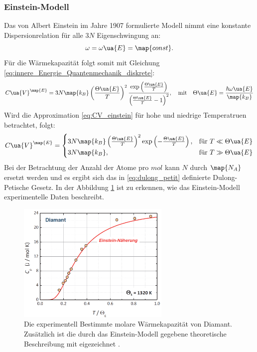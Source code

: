 \subsubsection{Einstein-Modell}
Das von Albert Einstein im Jahre 1907 formulierte Modell nimmt eine konstante
Dispersionrelation für alle $3N$ Eigenschwingung an:
\begin{equation}
  \label{eq:dispersion_einstein}
  \omega=\omega\ua{E}=\map{const}.
\end{equation}
Für die Wärmekapazität folgt somit mit Gleichung \eqref{eq:innere_Energie_Quantenmechanik_diskrete}:
\begin{equation}
  \label{eq:CV_einstein}
  C\ua{V}^{\map{E}}= 3N\map{k_B}\left(\frac{\Theta\ua{E}}{T}\right)^2\frac{\exp\left(\frac{\Theta\ua{E}}{T}\right)}{\left(\frac{\Theta\ua{E}}{T}-1\right)^2}, \quad \text{mit} \quad \Theta\ua{E} = \frac{\hbar\omega\ua{E}}{\map{k_B}}
\end{equation}
Wird die Approximation \eqref{eq:CV_einstein} für hohe und niedrige Temperatruen
betrachtet, folgt:
\begin{equation}
  C\ua{V}^{\map{E}}=
  \begin{cases}
     3N\map{k_B}\left(\frac{\Theta\ua{E}}{T}\right)^2 \exp\left(-\frac{\Theta\ua{E}}{T}\right), &\text{für } T\ll\Theta\ua{E}  \\
     3N\map{k_B}, & \text{für } T \gg \Theta\ua{E}
  \end{cases}
\end{equation}
Bei der Betrachtung der Anzahl der Atome pro $\si{mol}$ kann $N$ durch $\map{N_A}$
ersetzt werden und es ergibt sich das in \eqref{eq:dulong_petit} definierte
Dulong-Petische Gesetz. In der Abbildung \ref{fig: einstein_modell_plot} ist zu erkennen, wie das Einstein-Modell
experimentelle Daten beschreibt.
\begin{figure}
  \centering
  \includegraphics[width = 0.65\textwidth]{./content/images/einstein.PNG}
  \caption{Die experimentell Bestimmte molare Wärmekapazität von Diamant. Zusätzlich ist die durch das Einstein-Modell
  gegebene theoretische Beschreibung mit eigezeichnet \cite[S. 225]{marx}.}
  \label{fig: einstein_modell_plot}
\end{figure}
